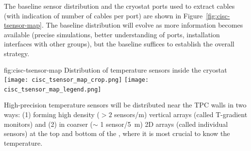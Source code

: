 The baseline sensor distribution and the cryostat ports used to extract cables (with indication of number of cables per port) are shown in Figure~\ref{fig:cisc-tsensor-map}. The baseline distribution will evolve as more information becomes available (precise  simulations, better understanding of  ports, installation interfaces with other groups), but the baseline suffices to establish the overall strategy.

\begin{dunefigure}{fig:cisc-tsensor-map}
  {Distribution of temperature sensors inside the cryostat}
  \texttt{[image: cisc\_tsensor\_map\_crop.png]}
  \texttt{[image: cisc\_tsensor\_map\_legend.png]}
\end{dunefigure}

High-precision temperature sensors will be distributed near the TPC walls in two ways:
(1) forming high density (\(>2\) sensors/\si{m}) vertical arrays %
(called T-gradient monitors) and (2) in coarser ($\sim$ 1 sensor/\SI{5}{m}) 2D arrays %
(called individual sensors) at the top and bottom of the , where it is most crucial to know the temperature.%


